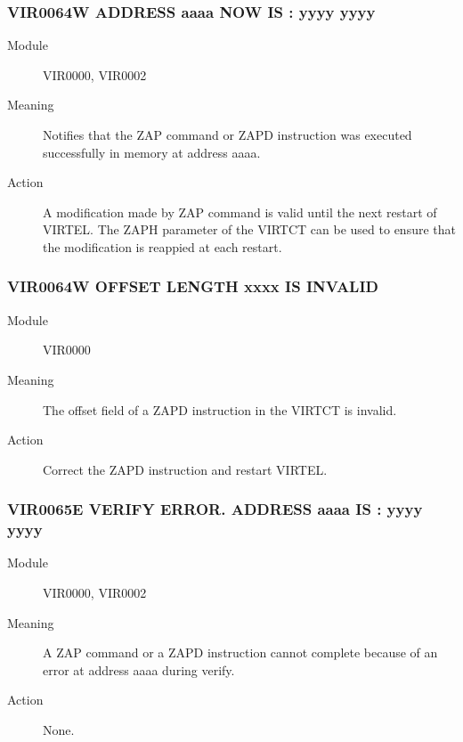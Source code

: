 \documentclass[letterpaper,10pt,english]{sphinxmanual}
\begin{document}
\subsubsection{VIR0064W ADDRESS aaaa NOW IS :  yyyy yyyy}
\label{\detokenize{messages:vir0064w-address-aaaa-now-is-yyyy-yyyy}}\begin{description}
\item[{Module}] \leavevmode
VIR0000, VIR0002

\item[{Meaning}] \leavevmode
Notifies that the ZAP command or ZAPD instruction was executed successfully in memory at address aaaa.

\item[{Action}] \leavevmode
A modification made by ZAP command is valid until the next restart of VIRTEL. The ZAPH parameter of the VIRTCT can be used to ensure that the modification is reappied at each restart.

\end{description}


\subsubsection{VIR0064W OFFSET LENGTH xxxx IS INVALID}
\label{\detokenize{messages:vir0064w-offset-length-xxxx-is-invalid}}\begin{description}
\item[{Module}] \leavevmode
VIR0000

\item[{Meaning}] \leavevmode
The offset field of a ZAPD instruction in the VIRTCT is invalid.

\item[{Action}] \leavevmode
Correct the ZAPD instruction and restart VIRTEL.

\end{description}


\subsubsection{VIR0065E VERIFY ERROR. ADDRESS aaaa IS : yyyy yyyy}
\label{\detokenize{messages:vir0065e-verify-error-address-aaaa-is-yyyy-yyyy}}\begin{description}
\item[{Module}] \leavevmode
VIR0000, VIR0002

\item[{Meaning}] \leavevmode
A ZAP command or a ZAPD instruction cannot complete because of an error at address aaaa during verify.

\item[{Action}] \leavevmode
None.

\end{description}
\end{document}
